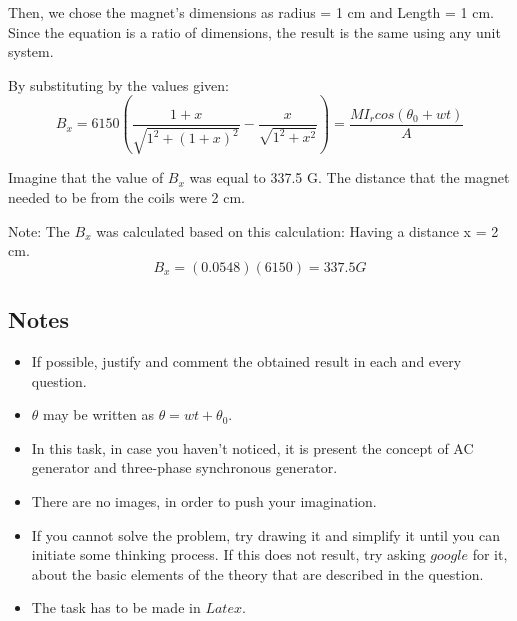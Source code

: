 \documentclass[a4paper,12pt]{article}
\begin{document}
Then, we chose the magnet's dimensions as radius = 1 cm and Length = 1 cm.
Since the equation is a ratio of dimensions, the result is the same using any unit system.

By substituting by the values given:
\begin{equation}
B_x = 6150 ( \frac{1+x}{\sqrt{1^2+(1+x)^2}}-\frac{x}{\sqrt{1^2+x^2}}) = \frac{MI_rcos(\theta_0 + wt)}{A}
\end{equation}

Imagine that the value of $B_x$ was equal to 337.5 G. The distance that the magnet needed to be from the coils were 2 cm.

Note: The $B_x$ was calculated based on this calculation:
Having a distance x = 2 cm.
$$B_x = (0.0548)(6150) = 337.5 G$$

\subsection{Notes}
\begin{itemize}
\item If possible, justify and comment the obtained result in each and every question.
\item $\theta$ may be written as $\theta = wt+ \theta_0$.
\item In this task, in case you haven't noticed, it is present the concept of AC generator and three-phase synchronous generator.
\item There are no images, in order to push your imagination.
\item If you cannot solve the problem, try drawing it and simplify it until you can initiate some thinking process. If this does not result, try asking $google$ for it, about the basic elements of the theory that are described in the question.
\item The task has to be made in $Latex$.
\end{itemize}




    
\end{document}
